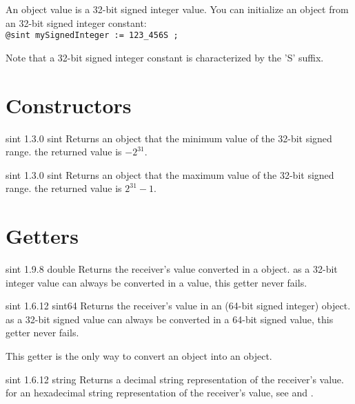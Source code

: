 

An  object value is a 32-bit signed integer value. You can initialize an  object from an 32-bit signed integer constant:\\

\texttt{@sint mySignedInteger := 123\_456S ;}

Note that a 32-bit signed integer constant is characterized by the 'S' suffix.


\section{Constructors}

{sint}
{1.3.0}
{sint}
{Returns an  object that the minimum value of the 32-bit signed range.}
{the returned value is $-2^{31}$.}





{sint}
{1.3.0}
{sint}
{Returns an  object that the maximum value of the 32-bit signed range.}
{the returned value is $2^{31}-1$.}



\section{Getters}

{sint}
{1.9.8}
{double}
{Returns the receiver's value converted in a  object.}
{as a 32-bit integer value can always be converted in a  value, this getter never fails.}





{sint}
{1.6.12}
{sint64}
{Returns the receiver's value in an  (64-bit signed integer) object.}
{as a 32-bit signed value can always be converted in a 64-bit signed value, this getter never fails.}

This getter is the only way to convert an  object into an  object.





{sint}
{1.6.12}
{string}
{Returns a decimal string representation of the receiver's value.}
{for an hexadecimal string representation of the receiver's value, see  and .}







